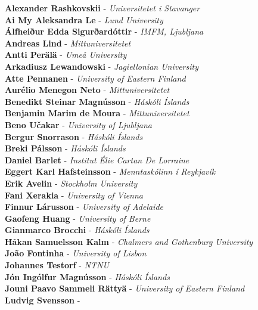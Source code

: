 \documentclass[12pt,openany]{report}      %
\begin{document}
\bigskip
\bigskip
\noindent
\textbf{Alexander Rashkovskii} -
\textit{Universitetet i Stavanger}
\\
\textbf{Ai My Aleksandra Le} -
\textit{Lund University}
\\
\textbf{Álfheiður Edda Sigurðardóttir} -
\textit{IMFM, Ljubljana}
\\
\textbf{Andreas Lind} -
\textit{Mittuniversitetet}
\\
\textbf{Antti Perälä} -
\textit{Umeå University}
\\
\textbf{Arkadiusz Lewandowski} -
\textit{Jagiellonian University}
\\
\textbf{Atte Pennanen} -
\textit{University of Eastern Finland}
\\
\textbf{Aurélio Menegon Neto} -
\textit{Mittuniversitetet}
\\
\textbf{Benedikt Steinar Magnússon} -
\textit{Háskóli Íslands}
\\
\textbf{Benjamin Marim de Moura} -
\textit{Mittuniversitetet}
\\
\textbf{Beno Učakar} -
\textit{University of Ljubljana}
\\
\textbf{Bergur Snorrason} -
\textit{Háskóli Íslands}
\\
\textbf{Breki Pálsson} -
\textit{Háskóli Íslands}
\\
\textbf{Daniel Barlet} -
\textit{Institut Élie Cartan De Lorraine}
\\
\textbf{Eggert Karl Hafsteinsson} -
\textit{Menntaskólinn í Reykjavík}
\\
\textbf{Erik Avelin} -
\textit{Stockholm University}
\\
\textbf{Fani Xerakia} -
\textit{University of Vienna}
\\
\textbf{Finnur Lárusson} -
\textit{University of Adelaide}
\\
\textbf{Gaofeng Huang} -
\textit{University of Berne}
\\
\textbf{Gianmarco Brocchi} -
\textit{Háskóli Íslands}
\\
\textbf{Håkan Samuelsson Kalm} -
\textit{Chalmers and Gothenburg University}
\\
\textbf{João Fontinha} -
\textit{University of Lisbon}
\\
\textbf{Johannes Testorf} -
\textit{NTNU}
\\
\textbf{Jón Ingólfur Magnússon} -
\textit{Háskóli Íslands}
\\
\textbf{Jouni Paavo Sammeli Rättyä} -
\textit{University of Eastern Finland}
\\
\textbf{Ludvig Svensson} -
\end{document}
